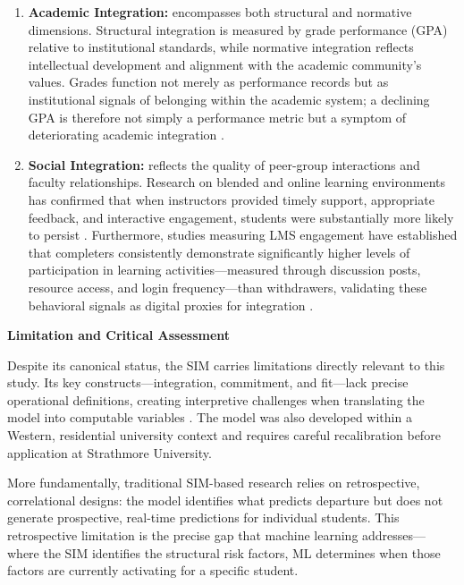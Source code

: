 \documentclass[12pt]{report}
\begin{document}
\begin{enumerate}
    \item \textbf{Academic Integration:} encompasses both structural and normative
    dimensions. Structural integration is measured by grade performance (GPA)
    relative to institutional standards, while normative integration reflects
    intellectual development and alignment with the academic community's values.
    Grades function not merely as performance records but as institutional signals
    of belonging within the academic system; a declining GPA is therefore not
    simply a performance metric but a symptom of deteriorating academic
    integration \parencite{tinto1975, bentojunior2025}.

    \item \textbf{Social Integration:} reflects the quality of peer-group
    interactions and faculty relationships. Research on blended and online
    learning environments has confirmed that when instructors provided timely
    support, appropriate feedback, and interactive engagement, students were
    substantially more likely to persist \parencite{Ivankova2007}. Furthermore,
    studies measuring LMS engagement have established that completers consistently
    demonstrate significantly higher levels of participation in learning
    activities---measured through discussion posts, resource access, and login
    frequency---than withdrawers, validating these behavioral signals as digital
    proxies for integration \parencite{Morris2005}.
\end{enumerate}

\textbf{Limitation and Critical Assessment}

Despite its canonical status, the SIM carries limitations directly relevant
to this study. Its key constructs---integration, commitment, and fit---lack
precise operational definitions, creating interpretive challenges when
translating the model into computable variables \parencite{Nicoletti2019}.
The model was also developed within a Western, residential university context
and requires careful recalibration before application at Strathmore University.

More fundamentally, traditional SIM-based research relies on retrospective,
correlational designs: the model identifies what predicts departure but does
not generate prospective, real-time predictions for individual students. This
retrospective limitation is the precise gap that machine learning addresses---
where the SIM identifies the structural risk factors, ML determines when those
factors are currently activating for a specific student.
\end{document}
